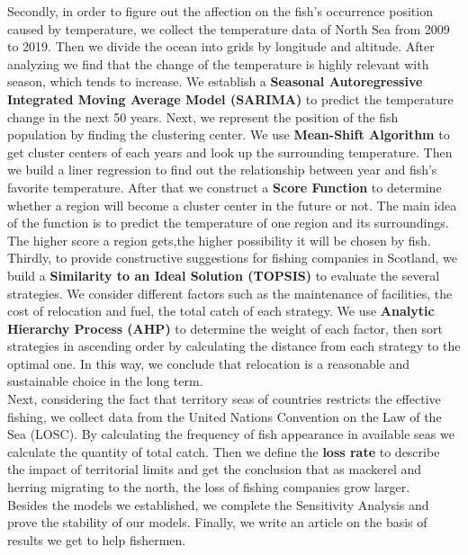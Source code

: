 \documentclass{mcmthesis}
\begin{document}
Secondly, in order to figure out the affection on the fish’s occurrence position caused by temperature, we collect the temperature data of North Sea from 2009 to 2019. Then we divide the ocean into grids by longitude and altitude. After analyzing we find that the change of the temperature is highly relevant with season, which tends to increase. We establish a \textbf{Seasonal Autoregressive Integrated Moving Average Model (SARIMA)} to predict the temperature change in the next 50 years. Next, we represent the position of the fish population by finding the clustering center. We use \textbf{Mean-Shift Algorithm} to get cluster centers of each years and look up the surrounding temperature. Then we build a liner regression to find out the relationship between year and fish's favorite temperature. After that we construct a \textbf{Score Function} to determine whether a region will become a cluster center in the future or not. The main idea of the function is to predict the temperature of one region and its surroundings. The higher score a region gets,the higher possibility it will be chosen by fish.\\

Thirdly, to provide constructive suggestions for fishing companies in Scotland, we build a \textbf{Similarity to an Ideal Solution (TOPSIS)} to evaluate the several strategies. We consider different factors such as the maintenance of facilities, the cost of relocation and fuel, the total catch of each strategy. We use \textbf{Analytic Hierarchy Process (AHP)} to determine the weight of each factor, then sort strategies in ascending order by calculating the distance from each strategy to the optimal one. In this way, we conclude that relocation is a reasonable and sustainable choice in the long term.\\


Next, considering the fact that territory seas of countries restricts the effective fishing, we collect data from the United Nations Convention on the Law of the Sea (LOSC). By calculating the frequency of fish appearance in available seas we calculate the quantity of total catch. Then we define the \textbf{loss rate} to describe the impact of territorial limits and get the conclusion that as mackerel and herring migrating to the north, the loss of fishing companies grow larger.\\

Besides the models we established, we complete the Sensitivity Analysis and prove the stability of our models. Finally, we write an article on the basis of results we get to help fishermen.\\
\end{document}
